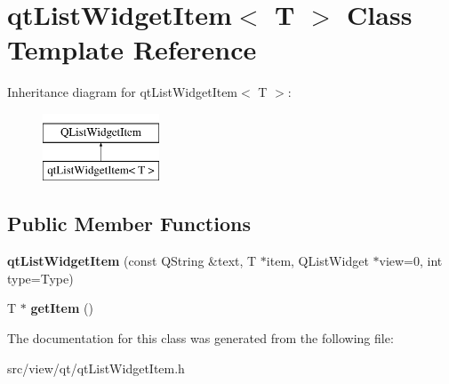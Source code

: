 \hypertarget{classqt_list_widget_item}{}\section{qt\+List\+Widget\+Item$<$ T $>$ Class Template Reference}
\label{classqt_list_widget_item}
Inheritance diagram for qt\+List\+Widget\+Item$<$ T $>$\+:\begin{figure}[H]
\begin{center}
\leavevmode
\includegraphics[height=2.000000cm]{classqt_list_widget_item}
\end{center}
\end{figure}
\subsection*{Public Member Functions}
\begin{DoxyCompactItemize}
\item 
\hypertarget{classqt_list_widget_item_a40ae78331ce2548e31b05a5dfe6396b4}{}{\bfseries qt\+List\+Widget\+Item} (const Q\+String \&text, T $\ast$item, Q\+List\+Widget $\ast$view=0, int type=Type)\label{classqt_list_widget_item_a40ae78331ce2548e31b05a5dfe6396b4}

\item 
\hypertarget{classqt_list_widget_item_a008ed2a5dd5c895cd19d96c2040258fd}{}T $\ast$ {\bfseries get\+Item} ()\label{classqt_list_widget_item_a008ed2a5dd5c895cd19d96c2040258fd}

\end{DoxyCompactItemize}


The documentation for this class was generated from the following file\+:\begin{DoxyCompactItemize}
\item 
src/view/qt/qt\+List\+Widget\+Item.\+h\end{DoxyCompactItemize}
